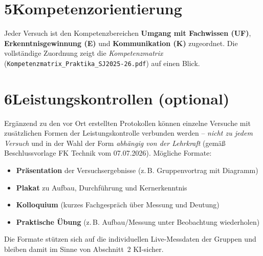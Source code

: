 \documentclass[11pt]{scrartcl}
\begin{document}
\section*{5\quad Kompetenzorientierung}
Jeder Versuch ist den Kompetenzbereichen \textbf{Umgang mit Fachwissen (UF)},
\textbf{Erkenntnisgewinnung (E)} und \textbf{Kommunikation (K)} zugeordnet.
Die vollständige Zuordnung zeigt die \emph{Kompetenzmatrix}
(\texttt{Kompetenzmatrix\_Praktika\_SJ2025-26.pdf}) auf einen Blick.

\section*{6\quad Leistungskontrollen (optional)}
Ergänzend zu den vor Ort erstellten Protokollen können einzelne Versuche mit
zusätzlichen Formen der Leistungskontrolle verbunden werden -- \emph{nicht zu
jedem Versuch} und in der Wahl der Form \emph{abhängig von der Lehrkraft}
(gemäß Beschlussvorlage FK Technik vom 07.07.2026). Mögliche Formate:
\begin{itemize}
  \item \textbf{Präsentation} der Versuchsergebnisse (z.\,B. Gruppenvortrag mit Diagramm)
  \item \textbf{Plakat} zu Aufbau, Durchführung und Kernerkenntnis
  \item \textbf{Kolloquium} (kurzes Fachgespräch über Messung und Deutung)
  \item \textbf{Praktische Übung} (z.\,B. Aufbau/Messung unter Beobachtung wiederholen)
\end{itemize}
Die Formate stützen sich auf die individuellen Live-Messdaten der Gruppen und
bleiben damit im Sinne von Abschnitt~2 KI-sicher.
\end{document}
